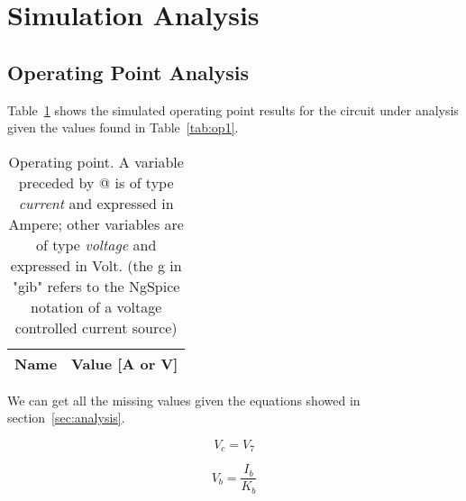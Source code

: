 \newpage
\section{Simulation Analysis}
\label{sec:simulation}

\subsection{Operating Point Analysis}

Table~\ref{tab:op} shows the simulated operating point results for the circuit
under analysis given the values found in Table~\ref{tab:op1}. 

\begin{table}[h]
  \centering
  \begin{tabular}{|l|r|}
    \hline    
    {\bf Name} & {\bf Value [A or V]} \\ \hline
    
  \end{tabular}
  \caption{Operating point. A variable preceded by @ is of type {\em current}
    and expressed in Ampere; other variables are of type {\it voltage} and expressed in
    Volt. (the g in "gib" refers to the NgSpice notation of a voltage controlled current source)}
  \label{tab:op}
\end{table}

We can get all the missing values given the equations showed in section~\ref{sec:analysis}.

\begin{equation}
  V_c = V_7
  \label{eq:1}
\end{equation}

\begin{equation}
  V_b = \frac{I_b}{K_b}
\end{equation}










